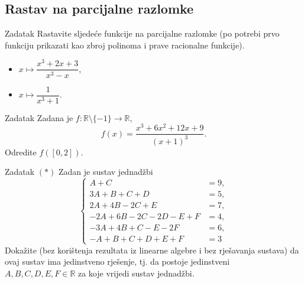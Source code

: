 \subsection*{Rastav na parcijalne razlomke}
\begin{exercise}{Zadatak}
Rastavite sljedeće funkcije na parcijalne razlomke (po potrebi prvo funkciju prikazati kao zbroj polinoma i prave racionalne funkcije). 
\begin{itemize}
\item[a)] \(x\mapsto \dfrac{x^3+2x+3}{x^3-x}\),
\item[b)] \(x\mapsto \dfrac{1}{x^3+1}\).
\end{itemize}
\end{exercise}
\begin{exercise}{Zadatak}
Zadana je \(f : \mathbb{R}\setminus\{-1\}\to\mathbb{R}\),
\[f(x)=\dfrac{x^3+6x^2+12x+9}{(x+1)^3}.\]
Odredite \(f\left([0, 2]\right)\).
\end{exercise}
\begin{exercise}{Zadatak} \((*)\) \textbf{}
Zadan je sustav jednadžbi
\[\begin{cases}
A + C&=9,\\
 3A + B + C + D&=5,\\
 2A + 4B - 2C + E&=7,\\
 -2A + 6B - 2C - 2D - E + F&=4,\\
 -3A + 4B + C - E - 2F&=6,\\
 -A + B + C + D + E + F&=3
   \end{cases}\]
Dokažite (bez korištenja rezultata iz linearne algebre i bez rješavanja sustava) da ovaj sustav ima jedinstveno rješenje, tj. da postoje jedinstveni \(A, B, C, D, E, F\in \mathbb{R}\) za koje vrijedi sustav jednadžbi.
\end{exercise}
